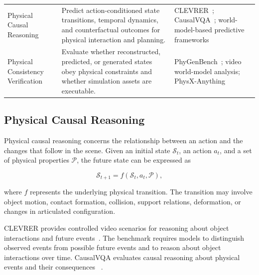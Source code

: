 \documentclass{SCIS2026}
\begin{document}
\begin{table}[t]
\begin{tabularx}{\textwidth}{
    L{0.21\textwidth}
    L{0.45\textwidth}
    Y
}
{Physical Causal Reasoning}
&
Predict action-conditioned state transitions, temporal
dynamics, and counterfactual outcomes for physical
interaction and planning.
&
CLEVRER~\cite{yi2019clevrer};
CausalVQA~\cite{foss2025causalvqa};
world-model-based predictive frameworks
~\cite{wang2026autonomous}
\\[4pt]


{Physical Consistency Verification}
&
Evaluate whether reconstructed, predicted, or generated
states obey physical constraints and whether simulation
assets are executable.
&
PhyGenBench~\cite{meng2024towards};
video world-model analysis;
PhysX-Anything~\cite{cao2025physxanything}
\\
\bottomrule
\end{tabularx}
\end{table}



\subsection{Physical Causal Reasoning}

Physical causal reasoning concerns the relationship between an action and
the changes that follow in the scene. Given an initial state
$\mathcal{S}_t$, an action $a_t$, and a set of physical properties
$\mathcal{P}$, the future state can be expressed as

\begin{equation}
    \mathcal{S}_{t+1}
    =
    f(\mathcal{S}_t, a_t, \mathcal{P}),
\end{equation}

where $f$ represents the underlying physical transition. The transition may
involve object motion, contact formation, collision, support relations,
deformation, or changes in articulated configuration.

CLEVRER provides controlled video scenarios for reasoning about object
interactions and future events~\cite{yi2019clevrer}. The benchmark requires
models to distinguish observed events from possible future events and to
reason about object interactions over time. CausalVQA evaluates causal
reasoning about physical events and their consequences
~\cite{foss2025causalvqa}.
\end{document}
